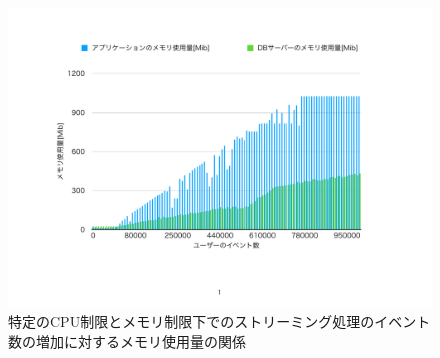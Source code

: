 \documentclass[../../../../../../main]{subfiles}
\begin{document}
    \begin{figure}[H]
        \centering
        \includegraphics[width=12cm]{graph}
        \caption{特定のCPU制限とメモリ制限下でのストリーミング処理のイベント数の増加に対するメモリ使用量の関係}
        \label{fig:stream-memory-app_1_1024-db_1_1024}
    \end{figure}
\end{document}
